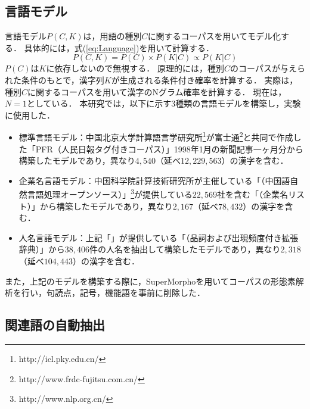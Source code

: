 \documentclass[japanese]{jnlp_1.4}
\begin{document}
{\subsection{言語モデル}\label{sec:categ}

言語モデル$P(C,K)$は，用語の種別$C$に関するコーパスを用いてモデル化する．
具体的には，式(\ref{eq:Language})を用いて計算する．
\begin{equation}
P(C,K)=P(C) \!\times \!P(K|C) \propto P(K|C)\label{eq:Language}
\end{equation}
$P(C)$は$K$に依存しないので無視する．
原理的には，種別$C$のコーパスが与えられた条件のもとで，漢字列$K$が生成される条件付き確率を計算する．
実際は，種別$C$に関するコーパスを用いて漢字のNグラム確率を計算する．
現在は，$N=1$としている．
本研究では，以下に示す3種類の言語モデルを構築し，実験に使用した．
\begin{itemize}
\item 標準言語モデル：中国北京大学計算語言学研究所\footnote{http://icl.pky.edu.cn/}が富士通\footnote{http://www.frdc-fujitsu.com.cn/}と共同で作成した「PFR（人民日報タグ付きコーパス）」\mbox{1998年}1月の新聞記事一ヶ月分から構築したモデルであり，異なり$4,540$（延べ$12,229,563$）の漢字を含む．
\item 企業名言語モデル：中国科学院計算技術研究所が主催している「（中国語自然言語処理オープンソース）」\footnote{http://www.nlp.org.cn/}が提供している$22,569$社を含む「（企業名リスト）」から構築したモデルであり，異なり$2,167$（延べ$78,432$）の漢字を含む．
\item 人名言語モデル：上記「」が提供している「（品詞および出現頻度付き拡張辞典）」から$38,406$件の人名を抽出して構築したモデルであり，異なり$2,318$（延べ$104,443$）の漢字を含む．
\end{itemize}

また，上記のモデルを構築する際に，SuperMorphoを用いてコーパスの形態素解析を行い，句読点，記号，機能語を事前に削除した．

\subsection{関連語の自動抽出}\label{sec:auto}

}
\end{document}
